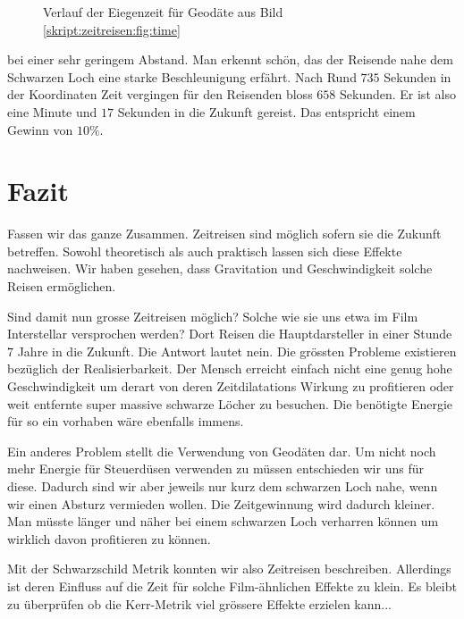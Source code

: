 \begin{refsection}
\begin{figure}
        \caption{Verlauf der Eiegenzeit für Geodäte aus Bild \ref{skript:zeitreisen:fig:time} }
        \label{skript:zeitreisen:fig:Bsp_time} 
    \end{figure}
    bei einer sehr geringem Abstand. Man erkennt schön, das der Reisende nahe dem Schwarzen Loch eine starke Beschleunigung erfährt. Nach Rund $735$ Sekunden in der Koordinaten Zeit vergingen für den Reisenden bloss $658$ Sekunden. Er ist also eine Minute und $17$ Sekunden in die Zukunft gereist. Das entspricht einem Gewinn von $10\%$.
    
   	\section{Fazit}
    
    Fassen wir das ganze Zusammen. Zeitreisen sind möglich sofern sie die Zukunft betreffen. Sowohl theoretisch als auch praktisch lassen sich diese Effekte nachweisen. Wir haben gesehen, dass Gravitation und Geschwindigkeit solche Reisen ermöglichen.
    
    Sind damit nun grosse Zeitreisen möglich? Solche wie sie uns etwa im Film Interstellar versprochen werden? Dort Reisen die Hauptdarsteller in einer Stunde $7$ Jahre in die Zukunft. Die Antwort lautet nein. Die grössten Probleme existieren bezüglich der Realisierbarkeit. Der Mensch erreicht einfach nicht eine genug hohe Geschwindigkeit um derart von deren Zeitdilatations Wirkung zu profitieren oder weit entfernte super massive schwarze Löcher zu besuchen. Die benötigte Energie für so ein vorhaben wäre ebenfalls immens.
    
    Ein anderes Problem stellt die Verwendung von Geodäten dar. Um nicht noch mehr Energie für Steuerdüsen verwenden zu müssen entschieden wir uns für diese. Dadurch sind wir aber jeweils nur kurz dem schwarzen Loch nahe, wenn wir einen Absturz vermieden wollen. Die Zeitgewinnung wird dadurch kleiner. Man müsste länger und näher bei einem schwarzen Loch verharren können um wirklich davon profitieren zu können. 
    
    Mit der Schwarzschild Metrik konnten wir also Zeitreisen beschreiben. Allerdings ist deren Einfluss auf die Zeit für solche Film-ähnlichen Effekte zu klein. Es bleibt zu überprüfen ob die Kerr-Metrik viel grössere Effekte erzielen kann...
        
	\printbibliography[heading=subbibliography]
	\end{refsection}

